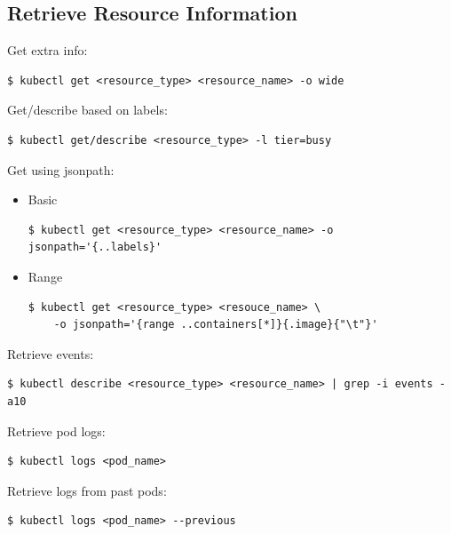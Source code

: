 \documentclass{article}
\newenvironment{codetemplate}[1][]{%
  \mybasecolorbox[#1]
  \itshape
}{%
  \endmybasecolorbox
}
\begin{document}
\subsection{Retrieve Resource Information}
Get extra info:
\begin{codetemplate}{}
\begin{verbatim}
$ kubectl get <resource_type> <resource_name> -o wide
\end{verbatim}
\end{codetemplate}

Get/describe based on labels:
\begin{codetemplate}{}
\begin{verbatim}
$ kubectl get/describe <resource_type> -l tier=busy
\end{verbatim}
\end{codetemplate}

Get using jsonpath:
\begin{itemize}
    \item Basic
\begin{codetemplate}
\begin{verbatim}
$ kubectl get <resource_type> <resource_name> -o jsonpath='{..labels}'
\end{verbatim}
\end{codetemplate}

    \item Range
\begin{codetemplate}
\begin{verbatim}
$ kubectl get <resource_type> <resouce_name> \
    -o jsonpath='{range ..containers[*]}{.image}{"\t"}'
\end{verbatim}
\end{codetemplate}
\end{itemize}

Retrieve events:
\begin{codetemplate}
\begin{verbatim}
$ kubectl describe <resource_type> <resource_name> | grep -i events -a10
\end{verbatim}
\end{codetemplate}

Retrieve pod logs:
\begin{codetemplate}
\begin{verbatim}
$ kubectl logs <pod_name>
\end{verbatim}
\end{codetemplate}

Retrieve logs from past pods:
\begin{codetemplate}
\begin{verbatim}
$ kubectl logs <pod_name> --previous
\end{verbatim}
\end{codetemplate}
\end{document}
